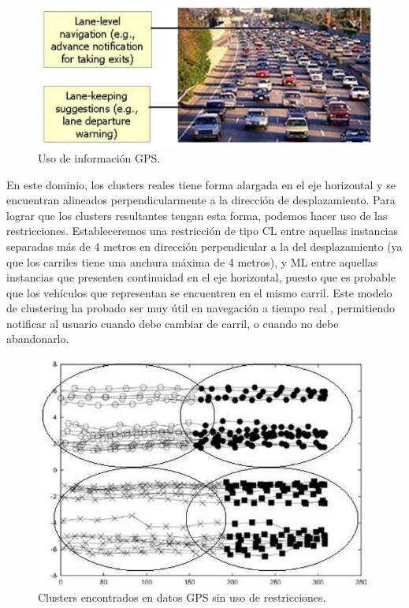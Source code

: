 \begin{figure}[!h]
	\centering
	\includegraphics[scale=0.3]{imagenes/c3/GPS/Coches} 
	\caption[Uso de información GPS.]{Uso de información GPS. \cite{Survey:2007} \cite{Wagstaff:2001b}}\label{fig:figure14}
\end{figure}


En este dominio, los clusters reales tiene forma alargada en el eje horizontal y se encuentran alineados perpendicularmente a la dirección de desplazamiento. Para lograr que los clusters resultantes tengan esta forma, podemos hacer uso de las restricciones. Estableceremos una restricción de tipo \acf{CL} entre aquellas instancias separadas más de 4 metros en dirección perpendicular a la del desplazamiento (ya que los carriles tiene una anchura máxima de 4 metros), y \acf{ML} entre aquellas instancias que presenten continuidad en el eje horizontal, puesto que es probable que los vehículos que representan se encuentren en el mismo carril. Este modelo de clustering ha probado ser muy útil en navegación a tiempo real \cite{Wagstaff:2001b}, permitiendo notificar al usuario cuando debe cambiar de carril, o cuando no debe abandonarlo.

\begin{figure}[!h]
	\centering
	\includegraphics[scale=0.32]{imagenes/c3/GPS/Instancias} 
	\caption[Clusters encontrados en datos GPS sin uso de restricciones.]{Clusters encontrados en datos \acs{GPS} sin uso de restricciones. \cite{Survey:2007} \cite{Wagstaff:2001b}}\label{fig:figure15}
\end{figure}

